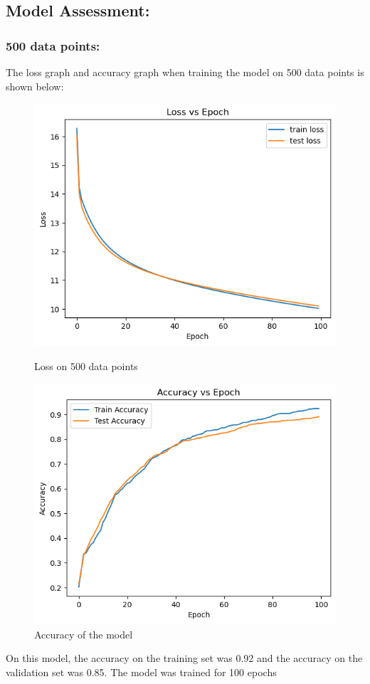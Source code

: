 \documentclass{article}
\begin{document}
\subsection*{Model Assessment:}
\subsubsection*{500 data points:}
The loss graph and accuracy graph when training the model on 500 data points is shown below:
\begin{figure}[h!]
    \centering
    \begin{minipage}{0.45\textwidth}
        \centering
        \includegraphics[width=1\textwidth]{graphs/loss_500.png} %
        \caption{Loss on 500 data points}
    \end{minipage}\hfill
    \begin{minipage}{0.45\textwidth}
        \centering
        \includegraphics[width=1\textwidth]{graphs/accuracy_500.png} %
        \caption{Accuracy of the model}
    \end{minipage}
\end{figure}
\newline On this model, the accuracy on the training set was 0.92 and the accuracy on the validation set was 0.85. The model was trained for 100 epochs
\end{document}

